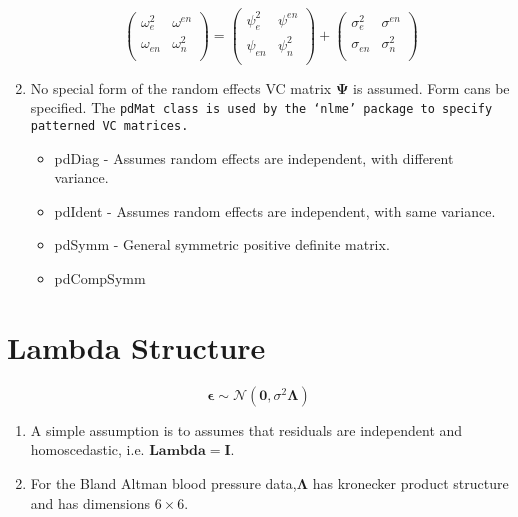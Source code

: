 \documentclass[12pt, a4paper]{article}
\begin{document}
\begin{enumerate}
\begin{equation}
\left( \begin{array}{cc}
  \omega^2_{e} & \omega^{en} \\
  \omega_{en} & \omega^2_{n} \\
\end{array}\right)
=
\left( \begin{array}{cc}
  \psi^2_{e} & \psi^{en} \\
  \psi_{en} & \psi^2_{n} \\
\end{array}\right)
+
\left( \begin{array}{cc}
  \sigma^2_{e} & \sigma^{en} \\
  \sigma_{en} & \sigma^2_{n} \\
\end{array}\right)
\end{equation}

\item  No special form of the random effects VC matrix $\boldsymbol{\Psi}$ is assumed.
Form cans be specified.
The \tt{pdMat} class is used by the `nlme' package to specify patterned VC matrices.
 \begin{itemize}
 \item pdDiag - Assumes random effects are independent, with different variance.
 \item pdIdent - Assumes random effects are independent, with same variance.
 \item pdSymm - General symmetric positive definite matrix.
 \item pdCompSymm
 \end{itemize}

\end{enumerate}

\newpage
\section{Lambda Structure}

\begin{equation}
\boldsymbol{\epsilon} \sim \mathcal{N}(\boldsymbol{0},\sigma^2 \boldsymbol{\Lambda})
\end{equation}
\begin{enumerate}
\item A simple assumption is to assumes that residuals are independent and homoscedastic, i.e. $\boldsymbol{Lambda = I}$.

\item For the Bland Altman blood pressure data,$\boldsymbol{\Lambda}$ has kronecker product structure
and has dimensions $6 \times 6$.
\end{enumerate}
\end{document}
